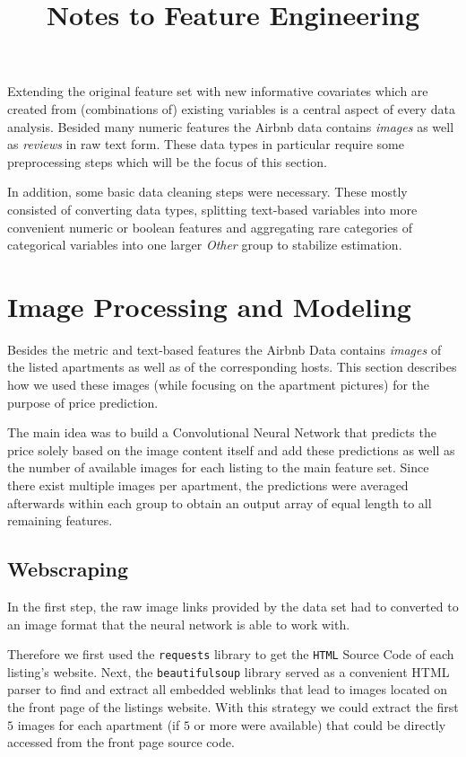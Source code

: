 \documentclass[12pt, letterpaper]{article}
\title{Notes to Feature Engineering}
\author{}
\date{}
\begin{document}
\maketitle

Extending the original feature set with new informative covariates which are created from (combinations of) existing variables is a central aspect of every data analysis.
Besided many numeric features the Airbnb data contains \emph{images} as well as \emph{reviews} in raw text form.
These data types in particular require some preprocessing steps which will be the focus of this section.

In addition, some basic data cleaning steps were necessary.
These mostly consisted of converting data types, splitting text-based variables into more convenient numeric or boolean features and aggregating rare categories of categorical variables into one larger \emph{Other} group to stabilize estimation.


\section{Image Processing and Modeling}

Besides the metric and text-based features the Airbnb Data contains \emph{images} of the listed apartments as well as of the corresponding hosts.
This section describes how we used these images (while focusing on the apartment pictures) for the purpose of price prediction.

The main idea was to build a Convolutional Neural Network that predicts the price solely based on the image content itself and add these predictions as well as the number of available images for each listing to the main feature set.
Since there exist multiple images per apartment, the predictions were averaged afterwards within each group to obtain an output array of equal length to all remaining features.

\subsection{Webscraping}

In the first step, the raw image links provided by the data set had to converted to an image format that the neural network is able to work with.

Therefore we first used the \texttt{requests} library to get the \texttt{HTML} Source Code of each listing's website.
Next, the \texttt{beautifulsoup} library served as a convenient HTML parser to find and extract all embedded weblinks that lead to images located on the front page of the listings website.
With this strategy we could extract the first $5$ images for each apartment (if $5$ or more were available) that could be directly accessed from the front page source code.
\end{document}
